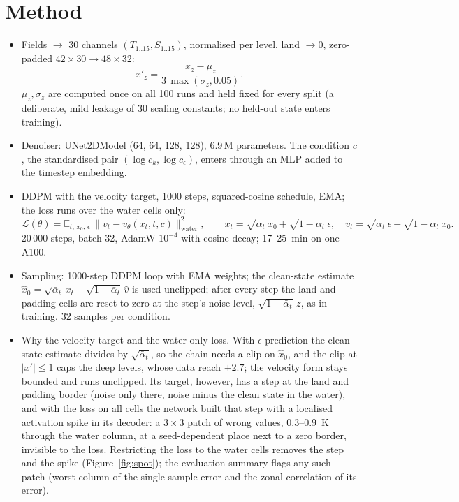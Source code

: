 \documentclass[11pt,a4paper]{article}
\begin{document}
\section{Method}
\begin{itemize}
  \item Fields $\to$ 30 channels $(T_{1..15}, S_{1..15})$, normalised per level, land $\to 0$,
        zero-padded $42\times30 \to 48\times32$:
        \begin{equation}
          x'_{z} = \frac{x_{z} - \mu_{z}}{3\,\max(\sigma_{z}, 0.05)} .
          \label{eq:norm}
        \end{equation}
        $\mu_z, \sigma_z$ are computed once on all 100 runs and held fixed for every split (a deliberate, mild
        leakage of 30 scaling constants; no held-out state enters training).
  \item Denoiser: UNet2DModel (64, 64, 128, 128), 6.9\,M parameters. The condition $c$, the standardised pair
        $(\log c_k, \log c_\epsilon)$, enters through an MLP added to the timestep embedding.
  \item DDPM with the velocity target, 1000 steps, squared-cosine schedule, EMA; the loss runs over the water
        cells only:
        \begin{equation}
          \mathcal L(\theta) = \mathbb E_{t,\,x_0,\,\epsilon}\,
          \big\| v_t - v_\theta(x_t, t, c) \big\|^2_{\mathrm{water}}, \qquad
          x_t = \sqrt{\bar\alpha_t}\,x_0 + \sqrt{1-\bar\alpha_t}\,\epsilon, \quad
          v_t = \sqrt{\bar\alpha_t}\,\epsilon - \sqrt{1-\bar\alpha_t}\,x_0 .
        \end{equation}
        20\,000 steps, batch 32, AdamW $10^{-4}$ with cosine decay; 17--\SI{25}{min} on one A100.
  \item Sampling: 1000-step DDPM loop with EMA weights; the clean-state estimate
        $\hat x_0 = \sqrt{\bar\alpha_t}\,x_t - \sqrt{1-\bar\alpha_t}\,\hat v$ is used unclipped; after every step
        the land and padding cells are reset to zero at the step's noise level, $\sqrt{1-\bar\alpha_t}\,z$, as in
        training. 32 samples per condition.
  \item Why the velocity target and the water-only loss. With $\epsilon$-prediction the clean-state estimate
        divides by $\sqrt{\bar\alpha_t}$, so the chain needs a clip on $\hat x_0$, and the clip at $|x'| \le 1$
        caps the deep levels, whose data reach $+2.7$; the velocity form stays bounded and runs unclipped. Its
        target, however, has a step at the land and padding border (noise only there, noise minus the clean state
        in the water), and with the loss on all cells the network built that step with a localised activation
        spike in its decoder: a $3\times3$ patch of wrong values, 0.3--\SI{0.9}{K} through the water column, at a
        seed-dependent place next to a zero border, invisible to the loss. Restricting the loss to the water cells
        removes the step and the spike (Figure~\ref{fig:spot}); the evaluation summary flags any such patch
        (worst column of the single-sample error and the zonal correlation of its error).
\end{itemize}
\end{document}
